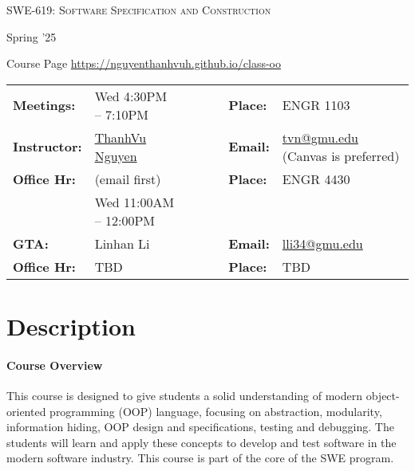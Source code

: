 \documentclass[11pt]{article}
\begin{document}
\begin{center}
{\Large \textsc{SWE-619: Software Specification and Construction}}

\vspace{0.1in}
{\large Spring '25}

\vspace{0.1in}
Course Page \url{https://nguyenthanhvuh.github.io/class-oo}
\end{center}

\begin{minipage}[t]{.75\textwidth}
    \centering
\begin{tabular}{llcccll}
  \toprule
  \textbf{Meetings:} & Wed 4:30PM -- 7:10PM  & & & & \textbf{Place:} & ENGR 1103\\
\textbf{Instructor:} & \href{https://go.gmu.edu/tvn}{ThanhVu Nguyen} & & &  & \textbf{Email:} &  \href{mailto:tvn@gmu.edu}{tvn@gmu.edu} (Canvas is preferred)\\
\textbf{Office Hr:} & (email first)& & & & \textbf{Place:} & ENGR 4430\\
&Wed 11:00AM -- 12:00PM &&&&&\\
  \hline
\textbf{GTA:} & Linhan Li & & &  & \textbf{Email:} &  \href{mailto:lli34@gmu.edu}{lli34@gmu.edu}\\
\textbf{Office Hr:} & TBD & & & & \textbf{Place:} & TBD \\
\bottomrule
\end{tabular}
\end{minipage}
 

\section{Description}

\paragraph{Course Overview}
This course is designed to give students a solid understanding of modern object-oriented programming (OOP) language, focusing on abstraction, modularity, information hiding, OOP design and specifications, testing and debugging. The students will learn and apply these concepts to develop and test software in the modern software industry.  This course is part of the core of the SWE program.
\end{document}
